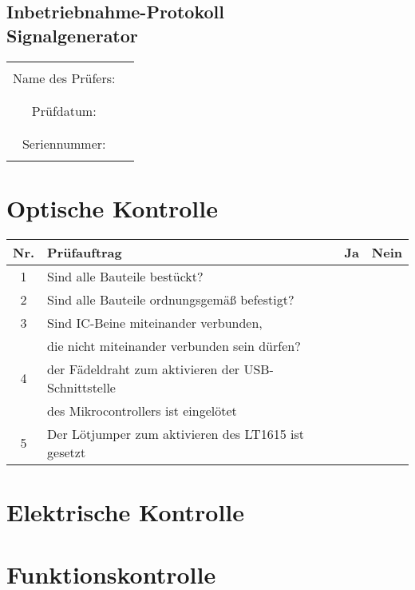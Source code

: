 \documentclass[a4paper,12pt]{article}
\begin{document}
\begin{center}
\section*{Inbetriebnahme-Protokoll \\ Signalgenerator}

	\begin{tabular}{|c|c|}
		\hline
		& \\
		Name des Prüfers: & \qquad \qquad \qquad \qquad \qquad \qquad \qquad \qquad \qquad \qquad \qquad \qquad \qquad \qquad \qquad \\
		& \\
		\hline
		& \\
		Prüfdatum: & \\
		& \\
		\hline
		& \\
		Seriennummer: & \\
		& \\
		\hline
	\end{tabular}
\end{center}

\section{Optische Kontrolle}

\begin{flushleft}
	\begin{tabular}{|c||l|c|c|}
		\hline
		Nr. & Prüfauftrag & Ja & Nein \\
		\hline
		1 & Sind alle Bauteile bestückt? & & \\
		\hline
		2 & Sind alle Bauteile ordnungsgemäß befestigt? & & \\
		\hline
		3 & Sind IC-Beine miteinander verbunden, & & \\
		& die nicht miteinander verbunden sein dürfen? & & \\
		\hline
		4 & der Fädeldraht zum aktivieren der USB-Schnittstelle & & \\
		& des Mikrocontrollers ist eingelötet & & \\
		\hline
		5 & Der Lötjumper zum aktivieren des LT1615 ist gesetzt & & \\
		\hline
	\end{tabular}
\end{flushleft}


\section{Elektrische Kontrolle}

\section{Funktionskontrolle}
\end{document}

